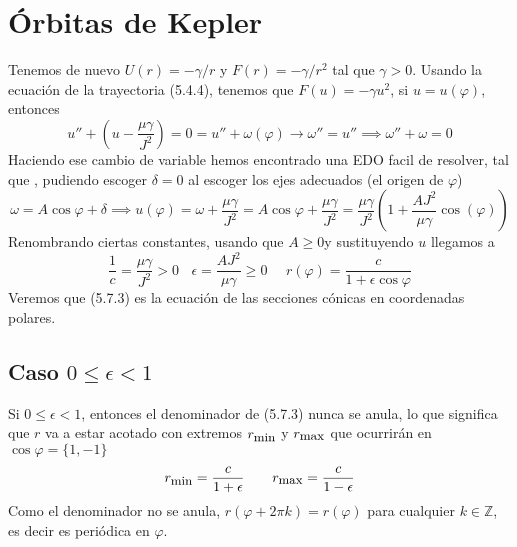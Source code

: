 \section{Órbitas de Kepler} 
Tenemos de nuevo $U(r)=-\gamma/r$ y $F(r)=-\gamma/r^2$ tal que $\gamma > 0$. Usando la ecuación de la trayectoria (5.4.4), tenemos que $F(u)=-\gamma u^2$, si $u=u(\varphi)$, entonces
\begin{equation} \label{5.7.1}
    u'' + \left(u -\frac{\mu \gamma}{J^2}\right) = 0 = u'' + \omega(\varphi) \rightarrow \omega'' = u'' \implies \omega'' + \omega = 0 
\end{equation} 
Haciendo ese cambio de variable hemos encontrado una EDO facil de resolver, tal que , pudiendo escoger $\delta =0$ al escoger los ejes adecuados (el origen de $\varphi$)
\begin{equation} \label{5.7.2}
    \omega = A \cos{\varphi +\delta} \implies u(\varphi) = \omega + \frac{\mu \gamma}{J^2} = A \cos{\varphi} +\frac{\mu \gamma}{J^2} = \frac{\mu \gamma}{J^2}\left(1+ \frac{A J^2}{\mu \gamma} \cos(\varphi)\right)
\end{equation} 
Renombrando ciertas constantes, usando que $A\geq0$y sustituyendo $u$ llegamos a 
\begin{equation} \label{5.7.3}
    \frac{1}{c} = \frac{\mu \gamma}{J^2}>0 \ \ \ \ \epsilon=\frac{A J^2}{\mu \gamma}\geq 0 \ \ \ \ \ \ r(\varphi) = \frac{c}{1+\epsilon \cos\varphi}
\end{equation} 
Veremos que (5.7.3) es la ecuación de las secciones cónicas en coordenadas polares.
\subsection{Caso $0 \leq \epsilon < 1 $}
Si $0 \leq \epsilon < 1 $, entonces el denominador de (5.7.3) nunca se anula, lo que significa que $r$ va a estar acotado con extremos $r_{\mbox{\small min}}$ y $r_{\mbox{\small max}}$ que ocurrirán en $\cos \varphi = \{1,-1\}$
\begin{equation} \label{5.7.4}
    r_{\mbox{\small min}}= \frac{c}{1+\epsilon} \ \ \ \ \ \ r_{\mbox{\small max}} = \frac{c}{1-\epsilon}
\end{equation} 
Como el denominador no se anula, $r(\varphi+2\pi k)=r(\varphi)$ para cualquier $k\in \mathbb{Z}$, es decir es periódica en $\varphi$.

